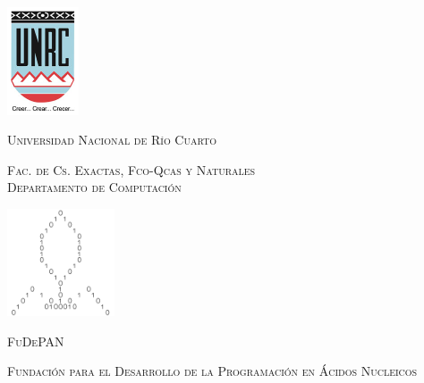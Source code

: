 \documentclass[12pt,spanish,a4paper]{report}
\begin{document}

	\begin{titlepage} 
		\begin{center}
		
            \begin{minipage}{0.45\textwidth}
                \begin{center}
                    \includegraphics[width=60pt,height=90.5pt]{images/escudo.jpg}\\
                    \begin{footnotesize}
                        \textsc{Universidad Nacional de Río Cuarto} \\
                    \end{footnotesize}
                    \vfill
                    \begin{scriptsize}
                        \textsc{Fac. de Cs. Exactas, Fco-Qcas y Naturales} \\
                        \textsc{Departamento de Computación} \\[1cm]    
                    \end{scriptsize}
                \end{center}
            \end{minipage}
            \begin{minipage}{0.45\textwidth}
                \begin{center}
                    \includegraphics[width=90pt,height=90pt]{images/logo-fudepan.png}\\
                    \vfill
                    \begin{footnotesize}
                        \textsc{FuDePAN} \\
                    \end{footnotesize}
                    \begin{scriptsize}
                        \textsc{Fundación para el Desarrollo de la Programación en Ácidos Nucleicos} \\[1cm]    
                    \end{scriptsize}
                \end{center}
            \end{minipage}


\end{center}
\end{titlepage}
\end{document}
